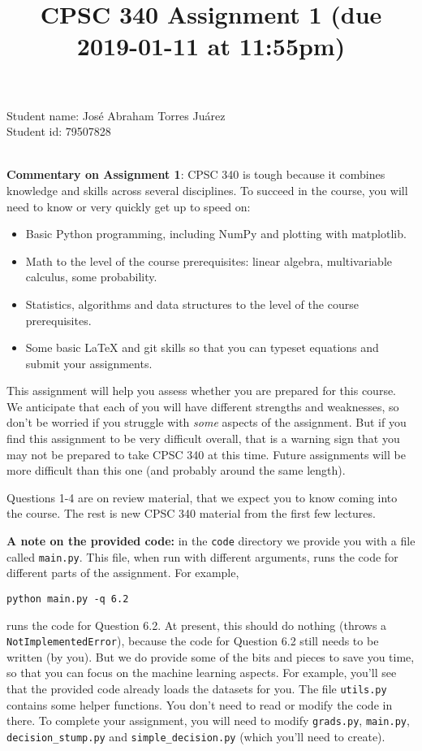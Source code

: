 \documentclass{article}
\def\gre#1{{\color{gre}#1}}
\begin{document}
\title{CPSC 340 Assignment 1 (due 2019-01-11 at 11:55pm)}


\date{}
\maketitle


\vspace{-4em}
\gre{
    Student name: José Abraham Torres Juárez \\
    Student id: 79507828 \\ \\
}

\textbf{Commentary on Assignment 1}: CPSC 340 is tough because it combines knowledge and skills across several disciplines. To succeed
in the course, you will need to know or very quickly get up to speed on:
\begin{itemize}
\item Basic Python programming, including NumPy and plotting with matplotlib.
\item Math to the level of the course prerequisites: linear algebra, multivariable calculus, some probability.
\item Statistics, algorithms and data structures to the level of the course prerequisites.
\item Some basic LaTeX and git skills so that you can typeset equations and submit your assignments.
\end{itemize}
  
This assignment will help you assess whether you are prepared for this course. We anticipate that each
of you will have different strengths and weaknesses, so don't be worried if you struggle with \emph{some} aspects
of the assignment. But if you find this assignment
to be very difficult overall, that is a warning sign that you may not be prepared to take CPSC 340
at this time. Future assignments will be more difficult than this one (and probably around the same length).

Questions 1-4 are on review material, that we expect you to know coming into the course. The rest is new CPSC 340 material from the first few lectures.

\textbf{A note on the provided code:} in the \texttt{code} directory we provide you with a file called
\texttt{main.py}. This file, when run with different arguments, runs the code for different
parts of the assignment. For example,
\begin{verbatim}
python main.py -q 6.2
\end{verbatim}
runs the code for Question 6.2. At present, this should do nothing (throws a \texttt{NotImplementedError}), because the code
for Question 6.2 still needs to be written (by you). But we do provide some of the bits
and pieces to save you time, so that you can focus on the machine learning aspects.
For example, you'll see that the provided code already loads the datasets for you.
The file \texttt{utils.py} contains some helper functions.
You don't need to read or modify the code in there.
To complete your assignment, you will need to modify \texttt{grads.py}, \texttt{main.py}, \texttt{decision\string_stump.py} and \texttt{simple\string_decision.py} (which you'll need to create).
\end{document}
